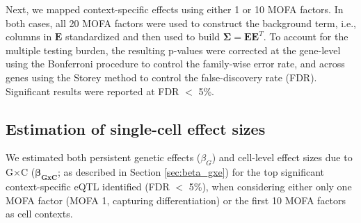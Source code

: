 Next, we mapped context-specific effects using either 1 or 10 MOFA factors. 
In both cases, all 20 MOFA factors were used to construct the background term, i.e., columns in $\mathbf{E}$ standardized and then used to build $\boldsymbol{\Sigma}=\mathbf{E}\mathbf{E}^T$.
To account for the multiple testing burden, the resulting p-values were corrected at the gene-level using the Bonferroni procedure to control the family-wise error rate, and across genes using the Storey method to control the false-discovery rate (FDR). 
Significant results were reported at FDR $<$ 5\%. 

\subsection{Estimation of single-cell effect sizes}

We estimated both persistent genetic effects ($\beta_G$) and cell-level effect sizes due to G$\times$C ($\boldsymbol{\beta_{GxC}}$; as described in Section \ref{sec:beta_gxe}) for the top significant context-specific eQTL identified (FDR $<$ 5\%), when considering either only one MOFA factor (MOFA 1, capturing differentiation) or the first 10 MOFA factors as cell contexts.




